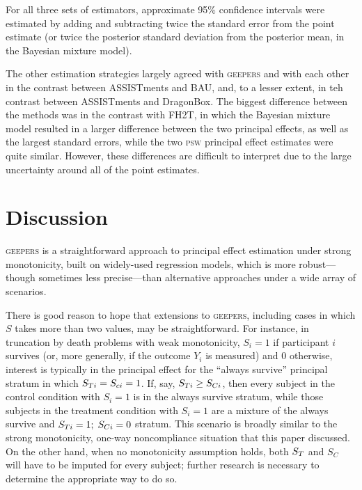 \documentclass[]{article}
\begin{document}
For all three sets of estimators, approximate 95\% confidence intervals were estimated by adding and subtracting twice the standard error from the point estimate (or twice the posterior standard deviation from the posterior mean, in the Bayesian mixture model).

The other estimation strategies largely agreed with \textsc{geepers} and with each other in the contrast between ASSISTments and BAU, and, to a lesser extent, in teh contrast between ASSISTments and DragonBox. The biggest difference between the methods was in the contrast with FH2T, in which the Bayesian mixture model resulted in a larger difference between the two principal effects, as well as the largest standard errors, while the two \textsc{psw} principal effect estimates were quite similar.  However, these differences are difficult to interpret due to the large uncertainty around all of the point estimates.

\section{Discussion}\label{sec:discussion}
\textsc{geepers} is a straightforward approach to principal effect estimation under strong monotonicity, built on widely-used regression models, which is more robust---though sometimes less precise---than alternative approaches under a wide array of scenarios.

There is good reason to hope that extensions to \textsc{geepers}, including cases in which $S$ takes more than two values, may be straightforward.
For instance, in truncation by death problems \citep[e.g.][]{zhangRubin,ding2011} with weak monotonicity, $S_i=1$ if participant $i$ survives (or, more generally, if the outcome $Y_i$ is measured) and 0 otherwise, interest is typically in the principal effect for the ``always survive'' principal stratum in which $S_{Ti}=S_{ci}=1$.
If, say, $S_{Ti}\ge S_{Ci}$, then every subject in the control condition with $S_i=1$ is in the always survive stratum, while those subjects in the treatment condition with $S_i=1$ are a mixture of the always survive and $S_{Ti}=1;\;S_{Ci}=0$ stratum.
This scenario is broadly similar to the strong monotonicity, one-way noncompliance situation that this paper discussed.
On the other hand, when no monotonicity assumption holds, both $S_T$ and $S_C$ will have to be imputed for every subject; further research is necessary to determine the appropriate way to do so.
\end{document}
